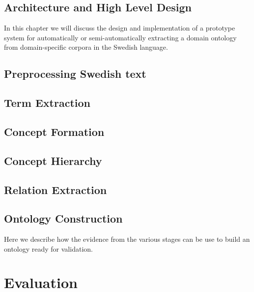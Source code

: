 \documentclass[a4paper]{report}
\begin{document}
\section{Architecture and High Level Design}

In this chapter we will discuss the design and implementation of a prototype system for automatically or semi-automatically extracting a domain ontology from domain-specific corpora in the Swedish language.

\section{Preprocessing Swedish text}

\section{Term Extraction}

\section{Concept Formation}

\section{Concept Hierarchy}

\section{Relation Extraction}

\section{Ontology Construction}

Here we describe how the evidence from the various stages can be use to build an ontology ready for validation.


\chapter{Evaluation}
\end{document}
